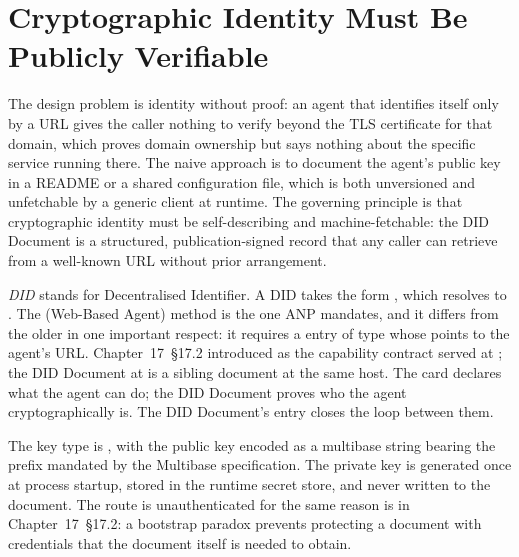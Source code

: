 \section{Cryptographic Identity Must Be Publicly Verifiable}
\label{sec:anp-did}

The design problem is identity without proof: an agent that identifies
itself only by a URL gives the caller nothing to verify beyond the TLS
certificate for that domain, which proves domain ownership but says nothing
about the specific service running there. The naive approach is to
document the agent's public key in a README or a shared configuration
file, which is both unversioned and unfetchable by a generic client at
runtime. The governing principle is that cryptographic identity must be
self-describing and machine-fetchable: the DID Document is a structured,
publication-signed record that any caller can retrieve from a well-known
URL without prior arrangement.

\emph{DID} stands for Decentralised Identifier. A  DID
takes the form , which resolves to
. The  (Web-Based
Agent) method is the one ANP mandates, and it differs from the older
 in one important respect: it requires a 
entry of type  whose
 points to the agent's  URL.
Chapter~17~\S17.2 introduced  as the capability contract
served at ; the DID Document at
 is a sibling document at the same host.
The card declares what the agent can do; the DID Document proves who the
agent cryptographically is. The DID Document's 
entry closes the loop between them.

The key type is , with the public key
encoded as a  multibase string bearing the 
prefix mandated by the Multibase specification. The private key is
generated once at process startup, stored in the runtime secret store, and
never written to the document. The  route is
unauthenticated for the same reason  is in
Chapter~17~\S17.2: a bootstrap paradox prevents protecting a document with
credentials that the document itself is needed to obtain.

